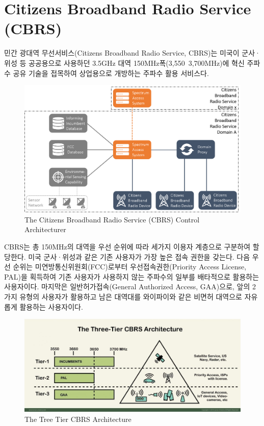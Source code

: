 \section{Citizens Broadband Radio Service (CBRS)}
민간 광대역 무선서비스(Citizens Broadband Radio Service, CBRS)는 미국이 군사·위성 등 공공용으로 사용하던 3.5GHz 대역 150MHz폭(3,550~3,700MHz)에 혁신 주파수 공유 기술을 접목하여 상업용으로 개방하는 주파수 활용 서비스다. \\
\vspace{-4mm}  
    \begin{figure}[!h]\centering
		\includegraphics[width=.75\textwidth]{image/week02/1-1.png}
		\caption{\small The Citizens Broadband Radio Service (CBRS) Control Architecturer}
		\vspace{-10pt}
    \end{figure}

CBRS는 총 150MHz의 대역을 우선 순위에 따라 세가지 이용자 계층으로 구분하여 할당한다. 미국 군사·위성과 같은 기존 사용자가 가장 높은 접속 권한을 갖는다. 다음 우선 순위는 미연방통신위원회(FCC)로부터 우선접속권한(Priority Access License, PAL)을 획득하여 기존 사용자가 사용하지 않는 주파수의 일부를 배타적으로 활용하는 사용자이다. 마지막은 일반허가접속(General Authorized Access, GAA)으로, 앞의 2가지 유형의 사용자가 활용하고 남은 대역대를 와이파이와 같은 비면허 대역으로 자유롭게 활용하는 사용자이다. \\
\vspace{-4mm}  
    \begin{figure}[!h]\centering
		\includegraphics[width=.75\textwidth]{image/week02/1-2.png}
		\caption{\small The Tree Tier CBRS Architecture}
		\vspace{-10pt}
    \end{figure}


